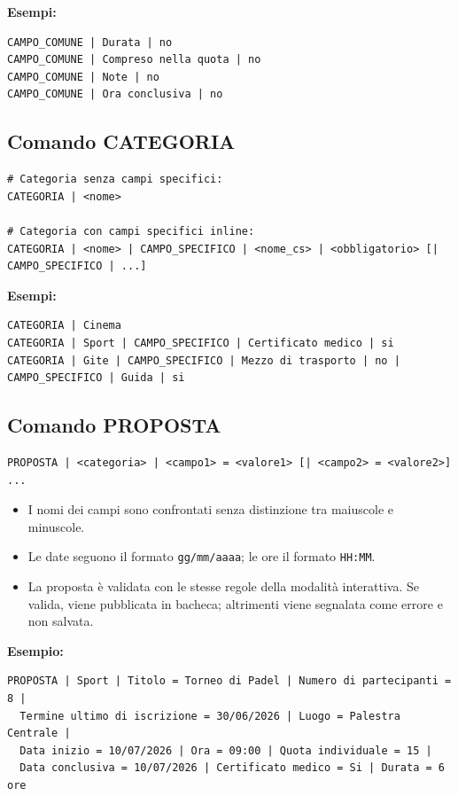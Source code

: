\documentclass[12pt,a4paper,oneside]{report}
\newcommand{\cmd}[1]{\texttt{\small#1}}
\begin{document}
\textbf{Esempi:}
\begin{lstlisting}[style=batch]
CAMPO_COMUNE | Durata | no
CAMPO_COMUNE | Compreso nella quota | no
CAMPO_COMUNE | Note | no
CAMPO_COMUNE | Ora conclusiva | no
\end{lstlisting}

\subsection{Comando CATEGORIA}

\begin{lstlisting}[style=batch]
# Categoria senza campi specifici:
CATEGORIA | <nome>

# Categoria con campi specifici inline:
CATEGORIA | <nome> | CAMPO_SPECIFICO | <nome_cs> | <obbligatorio> [| CAMPO_SPECIFICO | ...]
\end{lstlisting}

\textbf{Esempi:}
\begin{lstlisting}[style=batch]
CATEGORIA | Cinema
CATEGORIA | Sport | CAMPO_SPECIFICO | Certificato medico | si
CATEGORIA | Gite | CAMPO_SPECIFICO | Mezzo di trasporto | no | CAMPO_SPECIFICO | Guida | si
\end{lstlisting}

\subsection{Comando PROPOSTA}

\begin{lstlisting}[style=batch]
PROPOSTA | <categoria> | <campo1> = <valore1> [| <campo2> = <valore2>] ...
\end{lstlisting}

\begin{itemize}
  \item I nomi dei campi sono confrontati senza distinzione tra maiuscole e minuscole.
  \item Le date seguono il formato \cmd{gg/mm/aaaa}; le ore il formato \cmd{HH:MM}.
  \item La proposta è validata con le stesse regole della modalità interattiva. Se valida, viene pubblicata in bacheca; altrimenti viene segnalata come errore e non salvata.
\end{itemize}

\textbf{Esempio:}
\begin{lstlisting}[style=batch]
PROPOSTA | Sport | Titolo = Torneo di Padel | Numero di partecipanti = 8 |
  Termine ultimo di iscrizione = 30/06/2026 | Luogo = Palestra Centrale |
  Data inizio = 10/07/2026 | Ora = 09:00 | Quota individuale = 15 |
  Data conclusiva = 10/07/2026 | Certificato medico = Si | Durata = 6 ore
\end{lstlisting}
\end{document}
